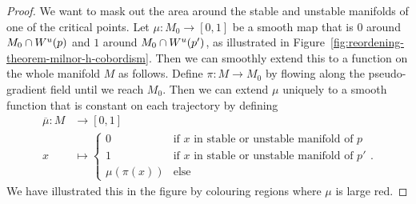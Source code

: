 \begin{proof}
    We want to mask out the area around the stable and unstable manifolds of one of the critical points.
    Let $\mu: M_0 \to  [0,1]$ be a smooth map that is $0$ around  $ M_0 \cap W^u(p)$ and $1$ around $M_0 \cap W^u(p')$, as illustrated in Figure~\ref{fig:reordening-theorem-milnor-h-cobordism}.
    Then we can smoothly extend this to a function on the whole manifold $M$ as follows.
    Define $\pi: M \to  M_0$ by flowing along the pseudo-gradient field until we reach $M_0$.
    Then we can extend $\mu$ uniquely to a smooth function that is constant on each trajectory by defining
    \begin{align*}
        \overline{\mu}: M &\longrightarrow [0,1] \\
        x &\longmapsto \begin{cases}
            0 & \text{if $x$ in stable or unstable manifold of $p$}\\
            1 & \text{if $x$ in stable or unstable manifold of $p'$}\\ 
            \mu(\pi(x)) & \text{else}
        \end{cases}
    .\end{align*}
    We have illustrated this in the figure by colouring regions where $\mu$ is large red.


\end{proof}
